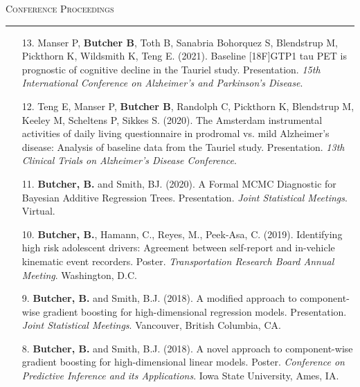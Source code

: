 \documentclass[a4paper]{article}
\begin{document}
\begin{flushleft}
  \Large\textsc{Conference Proceedings}
  \textcolor{usafagrey}{\rule[0.5\baselineskip]{\textwidth}{0.75pt}}
\end{flushleft}
\vspace{-1.5\baselineskip}

\begin{enumerate}

  \item[13.] Manser P, \textbf{Butcher B}, Toth B, Sanabria Bohorquez S,
    Blendstrup M, Pickthorn K, Wildsmith K, Teng E. (2021).
    Baseline [18F]GTP1 tau PET is prognostic of cognitive decline in the Tauriel study.
    Presentation. \textit{15th International Conference on
    Alzheimer’s and Parkinson’s Disease}.

  \item[12.] Teng E, Manser P, \textbf{Butcher B}, Randolph C, Pickthorn K,
    Blendstrup M, Keeley M, Scheltens P, Sikkes S. (2020). The Amsterdam instrumental
    activities of daily living questionnaire in prodromal vs. mild Alzheimer’s disease:
    Analysis of baseline data from the Tauriel study. Presentation.
    \textit{13th Clinical Trials on Alzheimer’s Disease Conference}.

  \item[11.] \textbf{Butcher, B.} and Smith, BJ. (2020). A Formal MCMC Diagnostic
    for Bayesian Additive Regression Trees. Presentation. \textit{Joint Statistical Meetings}.
    Virtual.

  \item[10.] \textbf{Butcher, B.}, Hamann, C., Reyes, M., Peek-Asa, C. (2019).
    Identifying high risk adolescent drivers: Agreement between self-report
    and in-vehicle kinematic event recorders. Poster.
    \textit{Transportation Research Board Annual Meeting}. Washington, D.C.

  \item[9.] \textbf{Butcher, B.} and Smith, B.J. (2018). A modified approach
    to component-wise gradient boosting for high-dimensional regression models.
    Presentation. \textit{Joint Statistical Meetings}. Vancouver, British Columbia, CA.

  \item[8.] \textbf{Butcher, B.} and Smith, B.J. (2018). A novel approach to
    component-wise gradient boosting for high-dimensional linear models.
    Poster. \textit{Conference on Predictive Inference and its Applications}.
    Iowa State University, Ames, IA.


\end{enumerate}
\end{document}
